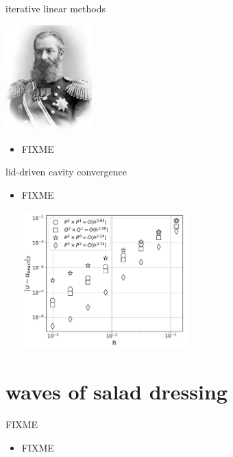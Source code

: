 \documentclass[10pt,hyperref,dvipsnames]{beamer}
\begin{document}
\begin{frame}{iterative linear methods}

\hfill \includegraphics[width=0.25\textwidth]{figs/people/akrylov.jpg}

\vspace{-20mm}
\begin{itemize}
\item FIXME
\end{itemize}
\end{frame}


\begin{frame}{lid-driven cavity convergence}

\begin{itemize}
\item FIXME
\begin{center}
\includegraphics[width=0.5\textwidth]{figs/stokesconv-uerr.pdf}
\end{center}
\end{itemize}
\end{frame}


\section{waves of salad dressing}

\begin{frame}{FIXME}

\begin{itemize}
\item FIXME
\end{itemize}
\end{frame}
\end{document}
